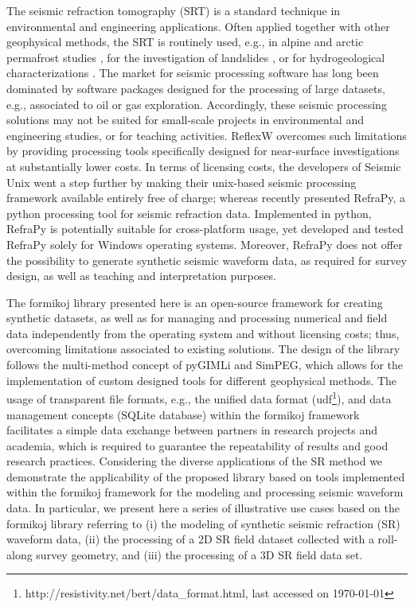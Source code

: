 \documentclass[a4paper,fleqn]{cas-sc}
\begin{document}
The seismic refraction tomography (SRT) is a standard technique in environmental and engineering applications. Often applied together with other geophysical methods, the SRT is routinely used, e.g., in alpine and arctic permafrost studies \citep[e.g.,][]{hilbich2010, ramachandran2011, krautblatter2014, steiner2021}, for the investigation of landslides \citep[e.g.,][]{samyn2012, uhlemann2016, whiteley2020}, or for hydrogeological characterizations \citep{ronczka2018, buecker2021}. 
The market for seismic processing software has long been dominated by software packages designed for the processing of large datasets, e.g., associated to oil or gas exploration. 
Accordingly, these seismic processing solutions may not be suited for small-scale projects in environmental and engineering studies, or for teaching activities. 
ReflexW overcomes such limitations by providing processing tools specifically designed for near-surface investigations at substantially lower costs. In terms of licensing costs, the developers of Seismic Unix \citep{stockwell1999} went a step further by making their unix-based seismic processing framework available entirely free of charge; whereas \citet{guedes2022} recently presented RefraPy, a python processing tool for seismic refraction data. 
Implemented in python, RefraPy is potentially suitable for cross-platform usage, yet \citet{guedes2022} developed and tested RefraPy solely for Windows operating systems. Moreover, RefraPy does not offer the possibility to generate synthetic seismic waveform data, as required for survey design, as well as teaching and interpretation purposes.

The formikoj library presented here is an open-source framework for creating synthetic datasets, as well as for managing and processing numerical and field data independently from the operating system and without licensing costs; thus, overcoming limitations associated to existing solutions. The design of the library follows the multi-method concept of pyGIMLi and SimPEG, which allows for the implementation of custom designed tools for different geophysical methods. 
The usage of transparent file formats, e.g., the unified data format (udf\footnote{http://resistivity.net/bert/data\_format.html, last accessed on \today}), and data management concepts (SQLite database) within the formikoj framework facilitates a simple data exchange between partners in research projects and academia, which is required to guarantee the repeatability of results and good research practices.
Considering the diverse applications of the SR method we demonstrate the applicability of the proposed library based on tools implemented within the formikoj framework for the modeling and processing seismic waveform data. 
In particular, we present here a series of illustrative use cases based on the formikoj library referring to (i) the modeling of synthetic seismic refraction (SR) waveform data, (ii) the processing of a 2D SR field dataset collected with a roll-along survey geometry, and (iii) the processing of a 3D SR field data set. 
\end{document}
